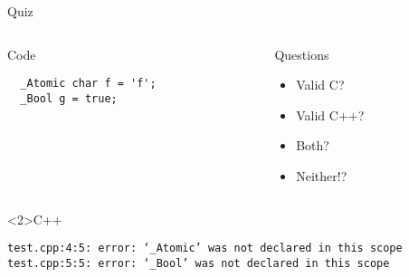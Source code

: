 \documentclass[presentation,aspectratio=169]{beamer}
\begin{document}
\begin{frame}[fragile,label={sec:org23c4234}]{Quiz}
\begin{columns}
\begin{column}{0.48\columnwidth}
\begin{block}{Code}
\begin{verbatim}
  _Atomic char f = 'f';
  _Bool g = true;
\end{verbatim}
\end{block}
\end{column}

\begin{column}{0.48\columnwidth}
\begin{block}{Questions}
\begin{itemize}
\item Valid C?
\item Valid C++?
\item Both?
\item Neither!?
\end{itemize}
\end{block}
\end{column}
\end{columns}

\begin{block}<2>{C++}
\begin{verbatim}
test.cpp:4:5: error: ‘_Atomic’ was not declared in this scope
test.cpp:5:5: error: ‘_Bool’ was not declared in this scope
\end{verbatim}
\end{block}
\end{frame}

\end{document}
